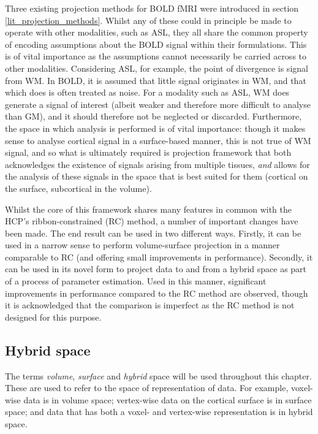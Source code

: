 Three existing projection methods for BOLD fMRI were introduced in section \ref{lit_projection_methods}. Whilst any of these could in principle be made to operate with other modalities, such as ASL, they all share the common property of encoding assumptions about the BOLD signal within their formulations. This is of vital importance as the assumptions cannot necessarily be carried across to other modalities. Considering ASL, for example, the point of divergence is signal from WM. In BOLD, it is assumed that little signal originates in WM, and that which does is often treated as noise. For a modality such as ASL, WM does generate a signal of interest (albeit weaker and therefore more difficult to analyse than GM), and it should therefore not be neglected or discarded. Furthermore, the space in which analysis is performed is of vital importance: though it  makes sense to analyse cortical signal in a surface-based manner, this is not true of WM signal, and so what is ultimately required is projection framework that both acknowledges the existence of signals arising from multiple tissues, \textit{and} allows for the analysis of these signals in the space that is best suited for them (cortical on the surface, subcortical in the volume).  

Whilst the core of this framework shares many features in common with the HCP's ribbon-constrained (RC) method, a number of important changes have been made. The end result can be used in two different ways. Firstly, it can be used in a narrow sense to perform volume-surface projection in a manner comparable to RC (and offering small improvements in performance). Secondly, it can be used in its novel form to project data to and from a hybrid space as part of a process of parameter estimation. Used in this manner, significant improvements in performance compared to the RC method are observed, though it is acknowledged that the comparison is imperfect as the RC method is not designed for this purpose. 

\subsection{Hybrid space}

The terms \textit{volume}, \textit{surface} and \textit{hybrid} space will be used throughout this chapter. These are used to refer to the space of representation of data. For example, voxel-wise data is in volume space; vertex-wise data on the cortical surface is in surface space; and data that has both a voxel- and vertex-wise representation is in hybrid space. 

